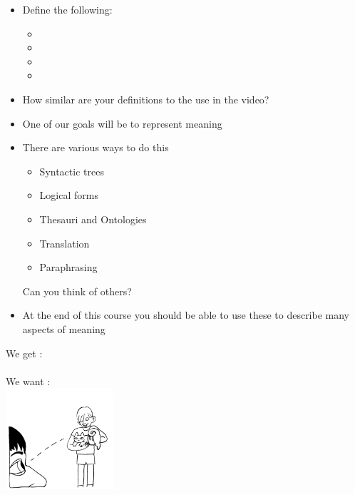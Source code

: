 \documentclass[a4paper,landscape,headrule,footrule,xetex,25pt]{foils}
\begin{document}

\begin{itemize}
\item Define the following:
  \begin{itemize}
  \item {}
  \item {}
  \item {}
  \item {}
  \end{itemize}
\item How similar are your definitions to the use in the video?
\end{itemize}




\begin{itemize}
\item One of our goals will be to represent meaning
\item There are various ways to do this
  \begin{itemize}
  \item Syntactic trees
  \item Logical forms
  \item Thesauri and Ontologies 
  \item Translation
  \item Paraphrasing
  \end{itemize}
Can you think of others?

\item At the end of this course you should be able to use these to
  describe many aspects of meaning
\end{itemize}



\begin{center}
\large We get : \\[2ex]
    \Large {} \\[3ex]
We want :
\\  \includegraphics[width=0.3\textwidth]{pics/1.png}
\end{center}
\end{document}
